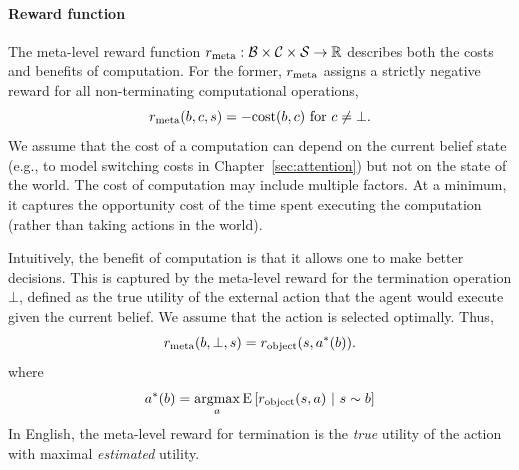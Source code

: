 

\paragraph{Reward function}
The meta-level reward function $r_{\text{meta}}: \mathcal{B} \times \mathcal{C} \times \mathcal{S} \rightarrow \mathbb{R}$ describes both the costs and benefits of computation. For the former, $r_{\text{meta}}$ assigns a strictly negative reward for all non-terminating computational operations,
%
\begin{equation}
r_{\text{meta}}(b, c, s) = -\text{cost}(b, c) \text{ for } c \neq \bot.
\end{equation}
%
We assume that the cost of a computation can depend on the current belief state (e.g., to model switching costs in Chapter~\ref{sec:attention}) but not on the state of the world. The cost of computation may include multiple factors. At a minimum, it captures the opportunity cost of the time spent executing the computation (rather than taking actions in the world).

Intuitively, the benefit of computation is that it allows one to make better decisions. This is captured by the meta-level reward for the termination operation $\bot$, defined as the true utility of the external action that the agent would execute given the current belief. We assume that the action is selected optimally. Thus,
%
\begin{equation}\label{eq:term-reward}
r_{\text{meta}}(b, \bot, s) = r_{\text{object}}(s, a^*(b)).
\end{equation}
%
where
%
\begin{equation}\label{eq:object-action}
a^*(b) = \operatorname*{argmax}_a \operatorname*{E} \left[ r_{\text{object}}(s, a) \ \middle\vert\ s \sim b \right]
\end{equation}
%
In English, the meta-level reward for termination is the \emph{true} utility of the action\footnotemark{} with maximal \emph{estimated} utility.


